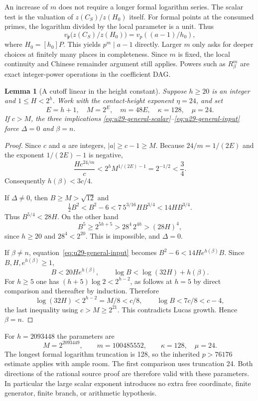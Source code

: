 \documentclass[11pt,a4paper]{article}
\newtheorem{lemma}[theorem]{Lemma}
\theoremstyle{definition}
\theoremstyle{remark}
\begin{document}
An increase of $m$ does not require a longer formal logarithm series.
The scalar test is the valuation of $z(C_S)/z(H_0)$ itself.  For formal
points at the consumed primes, the logarithm divided by the local
parameter is a unit.  Thus
\[
 v_{\mathfrak p}\bigl(z(C_S)/z(H_0)\bigr)
       =v_p((a-1)/h_0),
\]
where $H_0=[h_0]P$.  This yields $p^m\mid a-1$ directly.  Larger $m$
only asks for deeper choices at finitely many places in completeness.
Since $m$ is fixed, the local continuity and Chinese remainder argument
still applies.  Powers such as $R_\beta^m$ are exact integer-power
operations in the coefficient DAG.

\begin{lemma}[A cutoff linear in the height constant]
\label{lem:u29-linear-cutoff}
Suppose $h\ge20$ is an integer and $1\le H<2^h$.  Work with the
contact-height exponent $\eta=24$, and set
\[
 E=h+1,\quad M=2^E,\quad m=48E,\quad
 \kappa=128,\quad\mu=24.
\]
If $c>M$, the three implications
\eqref{eq:u29-general-scalar}--\eqref{eq:u29-general-input}
force $\Delta=0$ and $\beta=n$.
\end{lemma}
\begin{proof}
Since $c$ and $a$ are integers, $|a|\ge c-1\ge M$.
Because $24/m=1/(2E)$ and the exponent $1/(2E)-1$ is negative,
\[
 \frac{Hc^{24/m}}{c}
 <2^h M^{1/(2E)-1}=2^{-1/2}<\frac34.
\]
Consequently $h(\beta)<3c/4$.

If $\Delta\ne0$, then $B\ge M>\sqrt{12}$ and
\[
 \tfrac12 B^2<B^2-6
 <7\,5^{3/16}HB^{3/4}<14HB^{3/4}.
\]
Thus $B^{5/4}<28H$.  On the other hand
\[
 B^5\ge2^{5h+5}>28^4\,2^{4h}>(28H)^4,
\]
since $h\ge20$ and $28^4<2^{20}$.  This is impossible, and
$\Delta=0$.

If $\beta\ne n$, equation~\eqref{eq:u29-general-input} becomes
$B^2-6<14He^{h(\beta)}B$.  Since $B,H,e^{h(\beta)}\ge1$,
\[
                 B<20He^{h(\beta)},\qquad
                 \log B<\log(32H)+h(\beta).
\]
For $h\ge5$ one has $(h+5)\log2<2^{h-2}$, as follows at
$h=5$ by direct comparison and thereafter by induction.  Therefore
\[
 \log(32H)<2^{h-2}=M/8<c/8,
 \qquad \log B<7c/8<c-4,
\]
the last inequality using $c>M\ge2^{21}$.
This contradicts Lucas growth.  Hence $\beta=n$.
\end{proof}

For $h=2093448$ the parameters are
\[
 M=2^{2093449},\qquad m=100485552,\qquad
 \kappa=128,\quad\mu=24.
\]
The longest formal logarithm truncation is 128, so the inherited
$p>76176$ estimate applies with ample room.  The first comparison
uses truncation 24.  Both directions of the rational source proof
are therefore valid with these parameters.  In particular the large
scalar exponent introduces no extra free coordinate, finite generator,
finite branch, or arithmetic hypothesis.
\end{document}
